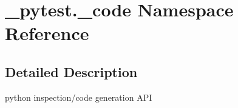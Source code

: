 \hypertarget{namespace__pytest_1_1__code}{}\section{\+\_\+pytest.\+\_\+code Namespace Reference}
\label{namespace__pytest_1_1__code}


\subsection{Detailed Description}
\begin{DoxyVerb}python inspection/code generation API \end{DoxyVerb}
 
